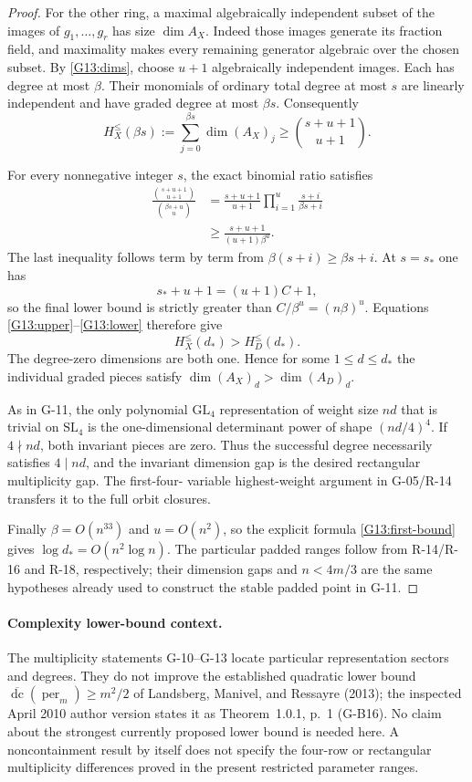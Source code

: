 \begin{proof}
For the other ring, a maximal algebraically independent
subset of the images of $g_1,\ldots,g_r$ has size
$\dim A_X$. Indeed those images generate its fraction
field, and maximality makes every remaining generator
algebraic over the chosen subset. By \eqref{G13:dims},
choose $u+1$ algebraically independent images. Each has
degree at most $\beta$. Their monomials of ordinary total
degree at most $s$ are linearly independent and have
graded degree at most $\beta s$. Consequently
\begin{equation}\label{G13:lower}
 H_X^{\leq}(\beta s)
 :=\sum_{j=0}^{\beta s}\dim(A_X)_j
 \geq\binom{s+u+1}{u+1}.
\end{equation}

For every nonnegative integer $s$, the exact binomial ratio
satisfies
\begin{align*}
 \frac{\binom{s+u+1}{u+1}}{\binom{\beta s+u}{u}}
 &=\frac{s+u+1}{u+1}
     \prod_{i=1}^u\frac{s+i}{\beta s+i}\\
 &\geq\frac{s+u+1}{(u+1)\beta^u}.
\end{align*}
The last inequality follows term by term from
$\beta(s+i)\geq\beta s+i$. At $s=s_*$ one has
\[
 s_*+u+1=(u+1)C+1,
\]
so the final lower bound is strictly greater than
$C/\beta^u=(n\beta)^u$. Equations
\eqref{G13:upper}--\eqref{G13:lower} therefore give
\[
 H_X^{\leq}(d_*)>H_D^{\leq}(d_*).
\]
The degree-zero dimensions are both one. Hence for some
$1\leq d\leq d_*$ the individual graded pieces satisfy
$\dim(A_X)_d>\dim(A_D)_d$.

As in G-11, the only polynomial $\mathrm{GL}_4$
representation of weight size $nd$ that is trivial on
$\mathrm{SL}_4$ is the one-dimensional determinant power
of shape $(nd/4)^4$. If $4\nmid nd$, both invariant
pieces are zero. Thus the successful degree necessarily
satisfies $4\mid nd$, and the invariant dimension gap is
the desired rectangular multiplicity gap. The first-four-
variable highest-weight argument in G-05/R-14 transfers
it to the full orbit closures.

Finally $\beta=O(n^{33})$ and $u=O(n^2)$, so the explicit
formula \eqref{G13:first-bound} gives
$\log d_*=O(n^2\log n)$. The particular padded ranges
follow from R-14/R-16 and R-18, respectively; their
dimension gaps and $n<4m/3$ are the same hypotheses already
used to construct the stable padded point in G-11.
\end{proof}

\paragraph{Complexity lower-bound context.}
The multiplicity statements G-10--G-13 locate particular representation
sectors and degrees. They do not improve the established quadratic
lower bound $\overline{\operatorname{dc}}(\operatorname{per}_m)
\geq m^2/2$ of Landsberg, Manivel, and Ressayre (2013);
the inspected April 2010 author version states it as Theorem~1.0.1,
p.~1 (G-B16). No claim about the strongest currently proposed lower
bound is needed here. A noncontainment result by itself does not
specify the four-row or rectangular multiplicity differences proved
in the present restricted parameter ranges.
